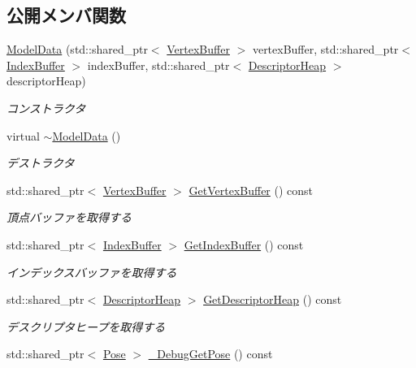 \subsection*{公開メンバ関数}
\begin{DoxyCompactItemize}
\item 
\mbox{\hyperlink{class_model_data_a020b20ee652b493d6400f153cce4d391}{Model\+Data}} (std\+::shared\+\_\+ptr$<$ \mbox{\hyperlink{class_vertex_buffer}{Vertex\+Buffer}} $>$ vertex\+Buffer, std\+::shared\+\_\+ptr$<$ \mbox{\hyperlink{class_index_buffer}{Index\+Buffer}} $>$ index\+Buffer, std\+::shared\+\_\+ptr$<$ \mbox{\hyperlink{class_descriptor_heap}{Descriptor\+Heap}} $>$ descriptor\+Heap)
\begin{DoxyCompactList}\small\item\em コンストラクタ \end{DoxyCompactList}\item 
virtual \mbox{\hyperlink{class_model_data_a8888ea03c5d27446f2f7f93f6fe6cd42}{$\sim$\+Model\+Data}} ()
\begin{DoxyCompactList}\small\item\em デストラクタ \end{DoxyCompactList}\item 
std\+::shared\+\_\+ptr$<$ \mbox{\hyperlink{class_vertex_buffer}{Vertex\+Buffer}} $>$ \mbox{\hyperlink{class_model_data_a4c76f184b373d682cd94a21440730ac0}{Get\+Vertex\+Buffer}} () const
\begin{DoxyCompactList}\small\item\em 頂点バッファを取得する \end{DoxyCompactList}\item 
std\+::shared\+\_\+ptr$<$ \mbox{\hyperlink{class_index_buffer}{Index\+Buffer}} $>$ \mbox{\hyperlink{class_model_data_a4b0d36d5d77479dc7d08977aded2bc94}{Get\+Index\+Buffer}} () const
\begin{DoxyCompactList}\small\item\em インデックスバッファを取得する \end{DoxyCompactList}\item 
std\+::shared\+\_\+ptr$<$ \mbox{\hyperlink{class_descriptor_heap}{Descriptor\+Heap}} $>$ \mbox{\hyperlink{class_model_data_a7b30fc0bbceb348a615241b4fd333515}{Get\+Descriptor\+Heap}} () const
\begin{DoxyCompactList}\small\item\em デスクリプタヒープを取得する \end{DoxyCompactList}\item 
std\+::shared\+\_\+ptr$<$ \mbox{\hyperlink{class_pose}{Pose}} $>$ \mbox{\hyperlink{class_model_data_a7c43dc81e963e445250c2ae8aceae9d0}{\+\_\+\+Debug\+Get\+Pose}} () const

\end{DoxyCompactItemize}
